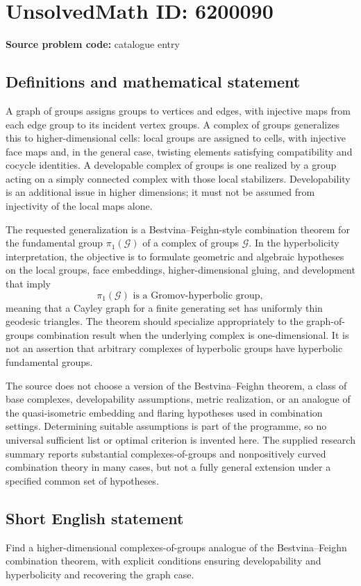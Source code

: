 \documentclass[11pt]{article}
\begin{document}
\section*{UnsolvedMath ID: 6200090}
\textbf{Source problem code:} catalogue entry
\subsection{Definitions and mathematical statement}
A graph of groups assigns groups to vertices and edges, with injective maps from each edge group to its incident vertex groups. A complex of groups generalizes this to higher-dimensional cells: local groups are assigned to cells, with injective face maps and, in the general case, twisting elements satisfying compatibility and cocycle identities. A developable complex of groups is one realized by a group acting on a simply connected complex with those local stabilizers. Developability is an additional issue in higher dimensions; it must not be assumed from injectivity of the local maps alone.

The requested generalization is a Bestvina--Feighn-style combination theorem for the fundamental group \(\pi_1(\mathcal G)\) of a complex of groups \(\mathcal G\). In the hyperbolicity interpretation, the objective is to formulate geometric and algebraic hypotheses on the local groups, face embeddings, higher-dimensional gluing, and development that imply
\[
\pi_1(\mathcal G)\text{ is a Gromov-hyperbolic group},
\]
meaning that a Cayley graph for a finite generating set has uniformly thin geodesic triangles. The theorem should specialize appropriately to the graph-of-groups combination result when the underlying complex is one-dimensional. It is not an assertion that arbitrary complexes of hyperbolic groups have hyperbolic fundamental groups.

The source does not choose a version of the Bestvina--Feighn theorem, a class of base complexes, developability assumptions, metric realization, or an analogue of the quasi-isometric embedding and flaring hypotheses used in combination settings. Determining suitable assumptions is part of the programme, so no universal sufficient list or optimal criterion is invented here. The supplied research summary reports substantial complexes-of-groups and nonpositively curved combination theory in many cases, but not a fully general extension under a specified common set of hypotheses.
\subsection{Short English statement}
Find a higher-dimensional complexes-of-groups analogue of the Bestvina--Feighn combination theorem, with explicit conditions ensuring developability and hyperbolicity and recovering the graph case.
\end{document}
